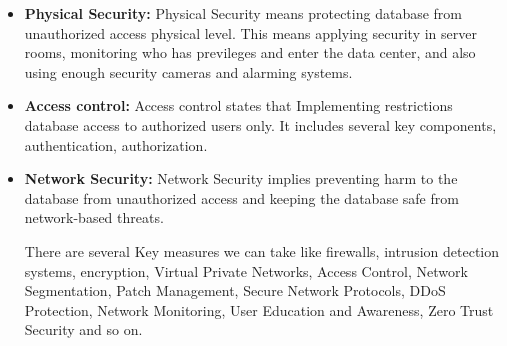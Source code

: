 \documentclass[12pt]{book} %
\begin{document}
\begin{itemize}
		\item \textbf{Physical Security:} Physical Security means protecting database from unauthorized access physical level. This means applying security in server rooms, monitoring who has previleges and enter the data center, and also using enough security cameras and alarming systems.
		
		
		\item \textbf{Access control:} Access control states that Implementing restrictions database access to authorized users only. It includes several key components, authentication, authorization.

        \item \textbf{Network Security:} Network Security implies preventing harm to the database from unauthorized access and keeping the database safe from network-based threats. 
        
        There are several Key measures we can take like firewalls, intrusion detection systems, encryption, Virtual Private Networks, Access Control, Network Segmentation, Patch Management, Secure Network Protocols, DDoS Protection, Network Monitoring, User Education and Awareness, Zero Trust Security and so on.




        


\end{itemize}
\end{document}

